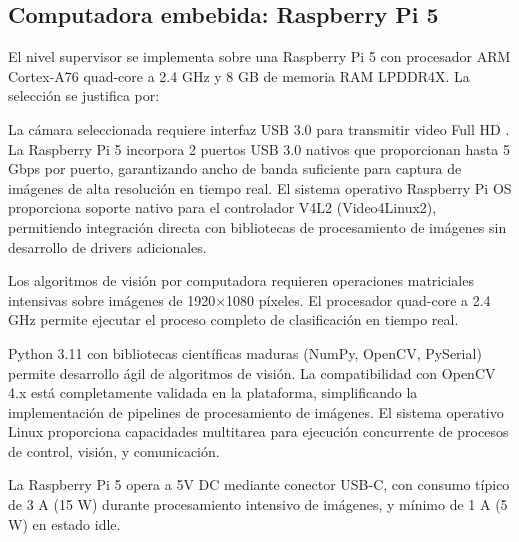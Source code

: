 \subsection{Computadora embebida: Raspberry Pi 5}

El nivel supervisor se implementa sobre una Raspberry Pi 5 con procesador ARM Cortex-A76 quad-core a 2.4 GHz y 8 GB de memoria RAM LPDDR4X. La selección se justifica por:

La cámara seleccionada requiere interfaz USB 3.0 para transmitir video Full HD . La Raspberry Pi 5 incorpora 2 puertos USB 3.0 nativos que proporcionan hasta 5 Gbps por puerto, garantizando ancho de banda suficiente para captura de imágenes de alta resolución en tiempo real. El sistema operativo Raspberry Pi OS proporciona soporte nativo para el controlador V4L2 (Video4Linux2), permitiendo integración directa con bibliotecas de procesamiento de imágenes sin desarrollo de drivers adicionales.

Los algoritmos de visión por computadora requieren operaciones matriciales intensivas sobre imágenes de 1920×1080 píxeles. El procesador quad-core a 2.4 GHz permite ejecutar el proceso completo de clasificación en tiempo real.

 Python 3.11 con bibliotecas científicas maduras (NumPy, OpenCV, PySerial) permite desarrollo ágil de algoritmos de visión. La compatibilidad con OpenCV 4.x está completamente validada en la plataforma, simplificando la implementación de pipelines de procesamiento de imágenes. El sistema operativo Linux proporciona capacidades multitarea para ejecución concurrente de procesos de control, visión, y comunicación.

La Raspberry Pi 5 opera a 5V DC mediante conector USB-C, con consumo típico de 3 A (15 W) durante procesamiento intensivo de imágenes, y mínimo de 1 A (5 W) en estado idle.
